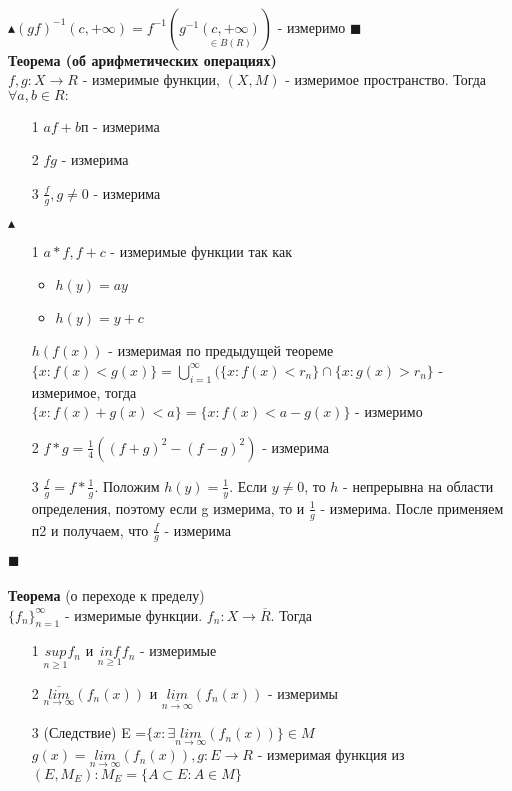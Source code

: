 \\
$\blacktriangle (gf)^{-1}(c, +\infty) = f^{-1}(g^{-1}\underset{\in B(R)}{(c, +\infty)})$ - измеримо $\blacksquare$
\\
\textbf{Теорема (об арифметических операциях)}
\\
$f, g: X \rightarrow R $  - измеримые функции, $(X, M)$ - измеримое пространство. Тогда $\forall a,b \in R :$
\begin{itemize}
    \item [1] $af + bп$ - измерима
     \item [2] $fg$ - измерима
     \item [3] $\frac{f}{g}, g \neq 0$ - измерима
\end{itemize}
$\blacktriangle$
\begin{itemize}
    \item [1] $a*f, f + c$ - измеримые функции так как
    \begin{itemize}
        \item $h(y) = ay$
        \item $h(y) = y + c$
    \end{itemize}
    $h(f(x))$ - измеримая по предыдущей теореме
    \\
    $\{x: f(x) < g(x)\} = \bigcup_{i=1}^{\infty}( \{x : f(x) < r_n\} \cap \{x : g(x) > r_n\}$ - измеримое, тогда
    \\
    $\{x: f(x) + g(x) < a\} = \{x: f(x) < a - g(x)\}$ - измеримо
    \item[2] $f*g = \frac{1}{4}((f+g)^2 - (f-g)^2)$ - измерима
    \item[3] $\frac{f}{g} = f *\frac{1}{g}$. Положим $h(y) = \frac{1}{y}$. Если $y \neq 0$, то $h$ - непрерывна на области определения, поэтому если g измерима, то и $\frac{1}{g}$ - измерима. После применяем п2 и получаем, что $\frac{f}{g}$ - измерима
\end{itemize}
$\blacksquare$
\\
\\
\textbf{Теорема} (о переходе к пределу)
\\
$\{f_n\}_{n=1}^{\infty}$ - измеримые функции. $f_n: X \rightarrow \overline{R}$. Тогда
\begin{itemize}
    \item [1] $\underset{n \geq 1}{sup}f_n$ и $\underset{n \geq 1}{inf}f_n$ - измеримые
     \item [2] $\overline{\underset{n\rightarrow\infty}{lim}}(f_n(x))$ и  $\underset{n\rightarrow\infty}{\underline{lim}}(f_n(x))$ - измеримы
     \item [3] (Следствие)  E =$\{x: \exists \underset{n\rightarrow\infty}{lim}(f_n(x)) \} \in M$ \\
     $g(x) = \underset{n\rightarrow\infty}{lim}(f_n(x)), g: E \rightarrow R$ - измеримая функция из $(E, M_E) : M_E = \{A \subset E: A\in M\}$
\end{itemize}
